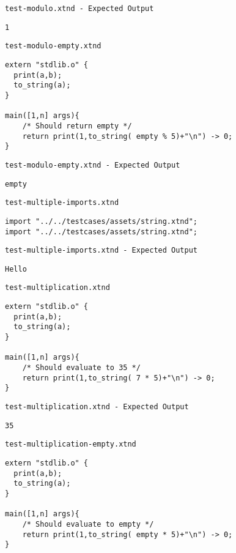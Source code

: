 \medskip \noindent \texttt{test-modulo.xtnd - Expected Output}


\begin{lstlisting}
1
\end{lstlisting}


\medskip \noindent \texttt{test-modulo-empty.xtnd}


\begin{lstlisting}
extern "stdlib.o" {
  print(a,b);
  to_string(a);
}

main([1,n] args){
	/* Should return empty */
	return print(1,to_string( empty % 5)+"\n") -> 0;
}
\end{lstlisting}


\medskip \noindent \texttt{test-modulo-empty.xtnd - Expected Output}


\begin{lstlisting}
empty
\end{lstlisting}


\medskip \noindent \texttt{test-multiple-imports.xtnd}


\begin{lstlisting}
import "../../testcases/assets/string.xtnd";
import "../../testcases/assets/string.xtnd";
\end{lstlisting}


\medskip \noindent \texttt{test-multiple-imports.xtnd - Expected Output}


\begin{lstlisting}
Hello
\end{lstlisting}


\medskip \noindent \texttt{test-multiplication.xtnd}


\begin{lstlisting}
extern "stdlib.o" {
  print(a,b);
  to_string(a);
}

main([1,n] args){
	/* Should evaluate to 35 */
	return print(1,to_string( 7 * 5)+"\n") -> 0;
}
\end{lstlisting}


\medskip \noindent \texttt{test-multiplication.xtnd - Expected Output}


\begin{lstlisting}
35
\end{lstlisting}


\medskip \noindent \texttt{test-multiplication-empty.xtnd}


\begin{lstlisting}
extern "stdlib.o" {
  print(a,b);
  to_string(a);
}

main([1,n] args){
	/* Should evaluate to empty */
	return print(1,to_string( empty * 5)+"\n") -> 0;
}
\end{lstlisting}


